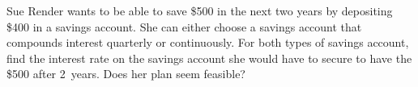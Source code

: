 \documentclass[11pt,letterpaper]{article}
\begin{document}
\newpage



 Sue Render wants to be able to save \$500 in the next two years by depositing \$400 in a savings account. She can either choose a savings account that compounds interest quarterly or continuously. For both types of savings account, find the interest rate on the savings account she would have to secure to have the \$500 after 2~years. Does her plan seem feasible? 
\end{document}
